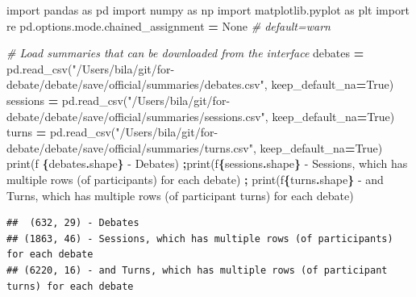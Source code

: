 \documentclass[
]{article}
\newenvironment{Shaded}{\begin{snugshade}}{\end{snugshade}}
\newcommand{\BuiltInTok}[1]{#1}
\newcommand{\CommentTok}[1]{\textcolor[rgb]{0.56,0.35,0.01}{\textit{#1}}}
\newcommand{\ImportTok}[1]{#1}
\newcommand{\NormalTok}[1]{#1}
\newcommand{\OperatorTok}[1]{\textcolor[rgb]{0.81,0.36,0.00}{\textbf{#1}}}
\newcommand{\SpecialCharTok}[1]{\textcolor[rgb]{0.81,0.36,0.00}{\textbf{#1}}}
\newcommand{\SpecialStringTok}[1]{\textcolor[rgb]{0.31,0.60,0.02}{#1}}
\newcommand{\StringTok}[1]{\textcolor[rgb]{0.31,0.60,0.02}{#1}}
\newcommand{\VariableTok}[1]{\textcolor[rgb]{0.00,0.00,0.00}{#1}}
\begin{document}
\begin{Shaded}
\begin{Highlighting}[]
\ImportTok{import}\NormalTok{ pandas }\ImportTok{as}\NormalTok{ pd}
\ImportTok{import}\NormalTok{ numpy }\ImportTok{as}\NormalTok{ np}
\ImportTok{import}\NormalTok{ matplotlib.pyplot }\ImportTok{as}\NormalTok{ plt}
\ImportTok{import}\NormalTok{ re}
\NormalTok{pd.options.mode.chained\_assignment }\OperatorTok{=} \VariableTok{None}  \CommentTok{\# default=\textquotesingle{}warn\textquotesingle{}}

\CommentTok{\# Load summaries that can be downloaded from the interface}
\NormalTok{debates }\OperatorTok{=}\NormalTok{ pd.read\_csv(}\StringTok{"/Users/bila/git/for{-}debate/debate/save/official/summaries/debates.csv"}\NormalTok{, keep\_default\_na}\OperatorTok{=}\VariableTok{True}\NormalTok{)}
\NormalTok{sessions }\OperatorTok{=}\NormalTok{ pd.read\_csv(}\StringTok{"/Users/bila/git/for{-}debate/debate/save/official/summaries/sessions.csv"}\NormalTok{, keep\_default\_na}\OperatorTok{=}\VariableTok{True}\NormalTok{)}
\NormalTok{turns }\OperatorTok{=}\NormalTok{ pd.read\_csv(}\StringTok{"/Users/bila/git/for{-}debate/debate/save/official/summaries/turns.csv"}\NormalTok{, keep\_default\_na}\OperatorTok{=}\VariableTok{True}\NormalTok{)}
\BuiltInTok{print}\NormalTok{(}\SpecialStringTok{f\textquotesingle{} }\SpecialCharTok{\{}\NormalTok{debates}\SpecialCharTok{.}\NormalTok{shape}\SpecialCharTok{\}}\SpecialStringTok{ {-} Debates\textquotesingle{}}\NormalTok{) }\OperatorTok{;}\BuiltInTok{print}\NormalTok{(}\SpecialStringTok{f\textquotesingle{}}\SpecialCharTok{\{}\NormalTok{sessions}\SpecialCharTok{.}\NormalTok{shape}\SpecialCharTok{\}}\SpecialStringTok{ {-} Sessions, which has multiple rows (of participants) for each debate\textquotesingle{}}\NormalTok{) }\OperatorTok{;} \BuiltInTok{print}\NormalTok{(}\SpecialStringTok{f\textquotesingle{}}\SpecialCharTok{\{}\NormalTok{turns}\SpecialCharTok{.}\NormalTok{shape}\SpecialCharTok{\}}\SpecialStringTok{ {-} and Turns, which has multiple rows (of participant turns) for each debate\textquotesingle{}}\NormalTok{)}
\end{Highlighting}
\end{Shaded}

\begin{verbatim}
##  (632, 29) - Debates
## (1863, 46) - Sessions, which has multiple rows (of participants) for each debate
## (6220, 16) - and Turns, which has multiple rows (of participant turns) for each debate
\end{verbatim}
\end{document}
